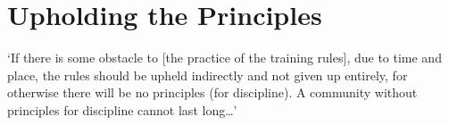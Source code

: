 
\section{Upholding the Principles}

`If there is some obstacle to [the practice of the training rules], due to time
and place, the rules should be upheld indirectly and not given up entirely, for
otherwise there will be no principles (for discipline). A community without
principles for discipline cannot last long\ldots{}'


